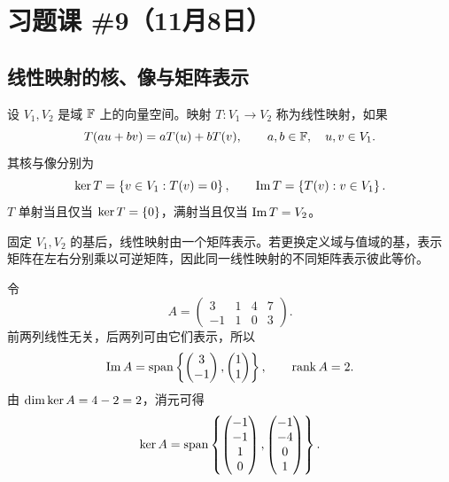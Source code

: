 \section{习题课 \#9（11月8日）}

\subsection{线性映射的核、像与矩阵表示}

设 $V_1,V_2$ 是域 $\mathbb F$ 上的向量空间。映射 $T:V_1\to V_2$ 称为线性映射，如果
\begin{equation}
 T(au+bv)=aT(u)+bT(v),
 \qquad a,b\in\mathbb F,
 \quad u,v\in V_1.
\end{equation}
其核与像分别为
\begin{equation}
 \operatorname{ker} T=\left\{v\in V_1:T(v)=0\right\},
 \qquad
 \operatorname{Im} T=\left\{T(v):v\in V_1\right\}.
\end{equation}
$T$ 单射当且仅当 $\operatorname{ker} T=\{0\}$，满射当且仅当 $\operatorname{Im} T=V_2$。

固定 $V_1,V_2$ 的基后，线性映射由一个矩阵表示。若更换定义域与值域的基，表示矩阵在左右分别乘以可逆矩阵，因此同一线性映射的不同矩阵表示彼此等价。

\begin{example}
令
\begin{equation}
 A=\begin{pmatrix}
 3&1&4&7\\
 -1&1&0&3
 \end{pmatrix}.
\end{equation}
前两列线性无关，后两列可由它们表示，所以
\begin{equation}
 \operatorname{Im} A
 =\operatorname{span}\left\{
 \begin{pmatrix}3\\-1\end{pmatrix},
 \begin{pmatrix}1\\1\end{pmatrix}
 \right\},
 \qquad
 \operatorname{rank} A=2.
\end{equation}
由 $\dim\operatorname{ker} A=4-2=2$，消元可得
\begin{equation}
 \operatorname{ker} A=\operatorname{span}\left\{
 \begin{pmatrix}-1\\-1\\1\\0\end{pmatrix},
 \begin{pmatrix}-1\\-4\\0\\1\end{pmatrix}
 \right\}.
\end{equation}
\end{example}

